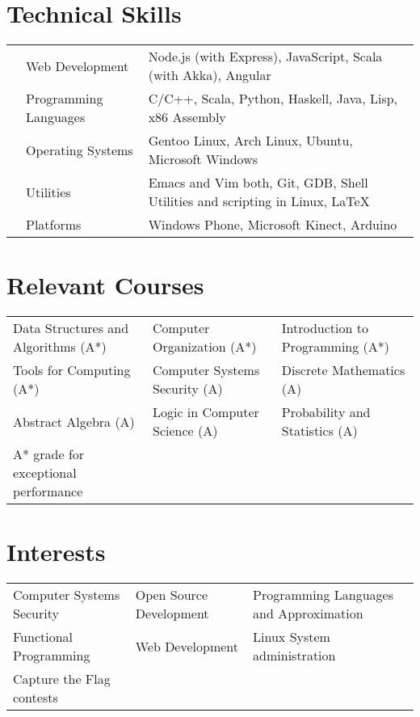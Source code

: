 \documentclass[11pt,a4paper]{moderncv}
\begin{document}
\section*{Technical Skills}
\begin{tabular}{L{0.05cm} L{5cm} l}
  &Web Development            &Node.js (with Express), JavaScript, Scala (with Akka), Angular\\
  &Programming Languages      &C/C++, Scala, Python, Haskell, Java,
                                Lisp, x86 Assembly\\
  &Operating Systems            &Gentoo Linux, Arch Linux, Ubuntu, Microsoft Windows\\
  &Utilities                  &Emacs and Vim both, Git, GDB, Shell
                                Utilities and scripting in Linux, \LaTeX\\
  &Platforms                  &Windows Phone, Microsoft Kinect, Arduino\\
\end{tabular}

\section*{Relevant Courses}
\begin{tabular}{L{6.8cm} L{6.0cm} l}
  Data Structures and Algorithms (A*) & Computer Organization (A*)
  & Introduction to Programming (A*)\\
  Tools for Computing (A*) & Computer Systems Security (A)
  & Discrete Mathematics (A)\\
  Abstract Algebra (A) & Logic in Computer Science (A)
  & Probability and Statistics (A)\\
  \vspace{0.3cm}
  \footnotesize{A* grade for exceptional performance} & &
\end{tabular}

\section*{Interests}
\begin{tabular}{L{5.5cm} L{5.5cm} l}
  Computer Systems Security & Open Source Development
  & Programming Languages and Approximation\\
  Functional Programming & Web Development
  & Linux System administration\\
  Capture the Flag contests & &
\end{tabular}
\end{document}
